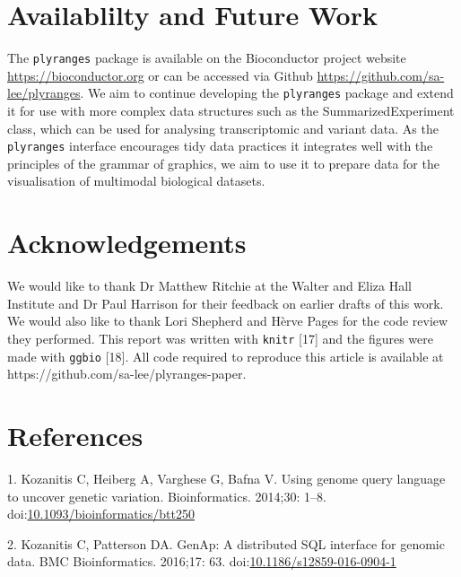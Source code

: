 \documentclass[10pt,letterpaper]{article}
\begin{document}
\hypertarget{availablilty-and-future-work}{%
\section{Availablilty and Future
Work}\label{availablilty-and-future-work}}

The \texttt{plyranges} package is available on the Bioconductor project
website \url{https://bioconductor.org} or can be accessed via Github
\url{https://github.com/sa-lee/plyranges}. We aim to continue developing
the \texttt{plyranges} package and extend it for use with more complex
data structures such as the SummarizedExperiment class, which can be
used for analysing transcriptomic and variant data. As the
\texttt{plyranges} interface encourages tidy data practices it
integrates well with the principles of the grammar of graphics, we aim
to use it to prepare data for the visualisation of multimodal biological
datasets.

\hypertarget{acknowledgements}{%
\section{Acknowledgements}\label{acknowledgements}}

We would like to thank Dr Matthew Ritchie at the Walter and Eliza Hall
Institute and Dr Paul Harrison for their feedback on earlier drafts of
this work. We would also like to thank Lori Shepherd and Hèrve Pages for
the code review they performed. This report was written with
\texttt{knitr} {[}17{]} and the figures were made with \texttt{ggbio}
{[}18{]}. All code required to reproduce this article is available at
https://github.com/sa-lee/plyranges-paper.

\hypertarget{references}{%
\section*{References}\label{references}}

\hypertarget{refs}{}
\leavevmode\hypertarget{ref-Kozanitis2014-va}{}%
1. Kozanitis C, Heiberg A, Varghese G, Bafna V. Using genome query
language to uncover genetic variation. Bioinformatics. 2014;30: 1--8.
doi:\href{https://doi.org/10.1093/bioinformatics/btt250}{10.1093/bioinformatics/btt250}

\leavevmode\hypertarget{ref-Kozanitis2016-bm}{}%
2. Kozanitis C, Patterson DA. GenAp: A distributed SQL interface for
genomic data. BMC Bioinformatics. 2016;17: 63.
doi:\href{https://doi.org/10.1186/s12859-016-0904-1}{10.1186/s12859-016-0904-1}
\end{document}
